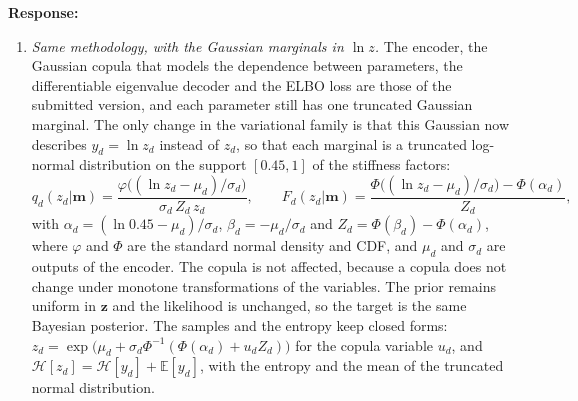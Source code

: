 \documentclass[11pt]{article}
\newenvironment{response}{\par\smallskip\noindent\color{resp}\textbf{Response:}\ }{\par}
\newcommand{\m}{\mathbf{m}}
\newcommand{\z}{\mathbf{z}}
\begin{document}
\begin{response}
\begin{enumerate}[leftmargin=*]
\item \emph{Same methodology, with the Gaussian marginals in $\ln z$.} The encoder, the Gaussian copula that models the
dependence between parameters, the differentiable eigenvalue decoder and the ELBO loss are those of the submitted
version, and each parameter still has one truncated Gaussian marginal. The only change in the variational family is that
this Gaussian now describes $y_d=\ln z_d$ instead of $z_d$, so that each marginal is a truncated log-normal distribution on
the support $[0.45,1]$ of the stiffness factors:
\begin{equation}
q_d(z_d|\m)=\frac{\varphi\big((\ln z_d-\mu_d)/\sigma_d\big)}{\sigma_d\,Z_d\,z_d},\qquad
F_d(z_d|\m)=\frac{\Phi\big((\ln z_d-\mu_d)/\sigma_d\big)-\Phi(\alpha_d)}{Z_d},
\label{eq:marginal}
\end{equation}
with $\alpha_d=(\ln 0.45-\mu_d)/\sigma_d$, $\beta_d=-\mu_d/\sigma_d$ and $Z_d=\Phi(\beta_d)-\Phi(\alpha_d)$, where
$\varphi$ and $\Phi$ are the standard normal density and CDF, and $\mu_d$ and $\sigma_d$ are outputs of the encoder. The
copula is not affected, because a copula does not change under monotone transformations of the variables. The prior
remains uniform in $\z$ and the likelihood is unchanged, so the target is the same Bayesian posterior. The samples and the
entropy keep closed forms: $z_d=\exp\big(\mu_d+\sigma_d\Phi^{-1}(\Phi(\alpha_d)+u_dZ_d)\big)$ for the copula variable
$u_d$, and $\mathcal{H}[z_d]=\mathcal{H}[y_d]+\mathbb{E}[y_d]$, with the entropy and the mean of the truncated normal
distribution.


\end{enumerate}
\end{response}
\end{document}

